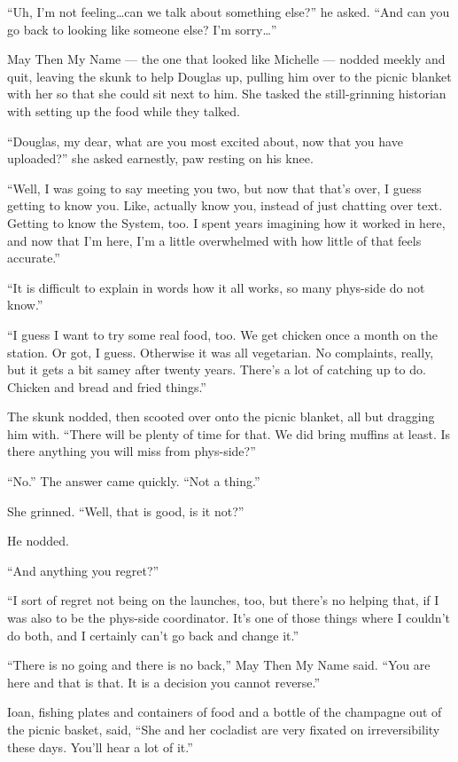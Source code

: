 ``Uh, I'm not feeling\ldots can we talk about something else?'' he asked. ``And can you go back to looking like someone else? I'm sorry\ldots{}''

May Then My Name — the one that looked like Michelle — nodded meekly and quit, leaving the skunk to help Douglas up, pulling him over to the picnic blanket with her so that she could sit next to him. She tasked the still-grinning historian with setting up the food while they talked.

``Douglas, my dear, what are you most excited about, now that you have uploaded?'' she asked earnestly, paw resting on his knee.

``Well, I was going to say meeting you two, but now that that's over, I guess getting to know you. Like, actually know you, instead of just chatting over text. Getting to know the System, too. I spent years imagining how it worked in here, and now that I'm here, I'm a little overwhelmed with how little of that feels accurate.''

``It is difficult to explain in words how it all works, so many phys-side do not know.''

``I guess I want to try some real food, too. We get chicken once a month on the station. Or got, I guess. Otherwise it was all vegetarian. No complaints, really, but it gets a bit samey after twenty years. There's a lot of catching up to do. Chicken and bread and fried things.''

The skunk nodded, then scooted over onto the picnic blanket, all but dragging him with. ``There will be plenty of time for that. We did bring muffins at least. Is there anything you will miss from phys-side?''

``No.'' The answer came quickly. ``Not a thing.''

She grinned. ``Well, that is good, is it not?''

He nodded.

``And anything you regret?''

``I sort of regret not being on the launches, too, but there's no helping that, if I was also to be the phys-side coordinator. It's one of those things where I couldn't do both, and I certainly can't go back and change it.''

``There is no going and there is no back,'' May Then My Name said. ``You are here and that is that. It is a decision you cannot reverse.''

Ioan, fishing plates and containers of food and a bottle of the champagne out of the picnic basket, said, ``She and her cocladist are very fixated on irreversibility these days. You'll hear a lot of it.''

